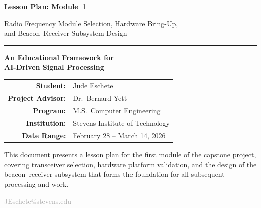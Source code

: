 \documentclass[11pt,letterpaper]{article}
\begin{document}
	
	\begin{titlepage}
		\centering
		\vspace*{2cm}
		
		{\Huge\bfseries\color{stevens} Lesson Plan: Module~1\par}
		\vspace{0.5cm}
		{\LARGE\color{darkgray} Radio Frequency Module Selection, Hardware Bring-Up,\\[4pt]
			and Beacon--Receiver Subsystem Design\par}
		
		\vspace{1.5cm}
		\rule{0.6\textwidth}{1pt}
		\vspace{1.5cm}
		
		{\Large\textbf{An Educational Framework for\\[4pt]
				AI-Driven Signal Processing}\par}
		
		\vspace{1.5cm}
		
		\begin{tabular}{rl}
			\textbf{Student:}         & Jude Eschete \\
			\textbf{Project Advisor:} & Dr.\ Bernard Yett \\
			\textbf{Program:}         & M.S.\ Computer Engineering \\
			\textbf{Institution:}     & Stevens Institute of Technology \\
			\textbf{Date Range:}      & February 28 -- March 14, 2026 \\
		\end{tabular}
		
		\vspace{2cm}
		
		\begin{tcolorbox}[colback=lightgray, colframe=darkgray, width=0.85\textwidth, arc=2pt]
			\centering\small
			This document presents a lesson plan for the first module of the capstone project,
			covering \RF{} transceiver selection, hardware platform validation, and the design of the
			beacon--receiver subsystem that forms the foundation for all subsequent \FPGA{} processing
			and \ML{} work.
		\end{tcolorbox}
		
		\vfill
		{\small\textcolor{darkgray}{JEschete@stevens.edu}}
	\end{titlepage}
	
\end{document}
